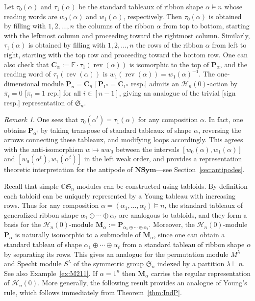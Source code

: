 \documentclass{amsart}
\newtheorem*{Young's Rule}{Young's Rule}
\theoremstyle{definition}
\theoremstyle{remark}
\newtheorem{remark}[theorem]{Remark}
\numberwithin{equation}{section}
\begin{document}
Let $\tau_0(\alpha)$ and $\tau_1(\alpha)$ be the standard tableaux of ribbon shape $\alpha\models n$ whose reading words are $w_0(\alpha)$ and $w_1(\alpha)$, respectively. Then $\tau_0(\alpha)$ is obtained by filling with $1,2,\ldots,n$ the columns of the ribbon $\alpha$ from top to bottom, starting with the leftmost column and proceeding toward the rightmost column. Similarly, $\tau_1(\alpha)$ is obtained by filling with $1,2,\ldots,n$ the rows of the ribbon $\alpha$ from left to right, starting with the top row and proceeding toward the bottom row. One can also check that ${\mathbf{C}}_\alpha :={{\mathbb F}} \cdot \tau_1({\operatorname{rev}}(\alpha))$ is isomorphic to the top of ${\mathbf{P}}_\alpha$, and the reading word of $\tau_1({\operatorname{rev}}(\alpha))$ is $w_1({\operatorname{rev}}(\alpha))=w_1(\alpha)^{-1}$. The one-dimensional module ${\mathbf{P}}_n={\mathbf{C}}_n$ [\,${\mathbf{P}}_{1^n}={\mathbf{C}}_{1^n}$ resp.] admits an ${\mathcal{H}}_n(0)$-action by ${\overline{\pi}}_i=0$ [${\overline{\pi}}_i=1$ rep.] for all $i\in[n-1]$, giving an analogue of the trivial [sign resp.] representation of ${{\mathfrak S}}_n$. 

\begin{remark}\label{rem:symmetryA}
One sees that $\tau_0(\alpha^t)=\tau_1(\alpha)$ for any composition $\alpha$. In fact, one obtains ${\mathbf{P}}_{\alpha^t}$ by taking transpose of standard tableaux of shape $\alpha$, reversing the arrows connecting these tableaux, and modifying loops accordingly. This agrees with the anti-isomorphism $w\mapsto ww_0$ between the intervals $[w_0(\alpha),w_1(\alpha)]$ and $[w_0(\alpha^t),w_1(\alpha^t)]$ in the left weak order, and provides a representation theoretic interpretation for the antipode of ${\mathbf{NSym}}$---see Section~\ref{sec:antipodes}. 
\end{remark}

Recall that simple ${{\mathbb C}}{{\mathfrak S}}_n$-modules can be constructed using tabloids. By definition each tabloid can be uniquely represented by a Young tableau with increasing rows. Thus for any composition $\alpha=(\alpha_1,\ldots,\alpha_\ell)\models n$, the standard tableaux of generalized ribbon shape $\alpha_1\oplus\cdots\oplus\alpha_\ell$ are analogous to tabloids, and they form a basis for the ${\mathcal{H}}_n(0)$-module ${\mathbf{M}}_\alpha:={\mathbf{P}}_{\alpha_1\oplus\cdots\oplus\alpha_\ell}$. Moreover, the ${\mathcal{H}}_n(0)$-module ${\mathbf{P}}_\alpha$ is naturally isomorphic to a submodule of ${\mathbf{M}}_\alpha$, since one can obtain a standard tableau of shape $\alpha_1\oplus\cdots\oplus\alpha_\ell$ from a standard tableau of ribbon shape $\alpha$ by separating its rows. This gives an analogue for the permutation module $M^\lambda$ and Specht module $S^\lambda$ of the symmetric group ${{\mathfrak S}}_n$ indexed by a partition $\lambda\vdash n$. See also Example~\ref{ex:M211}. If $\alpha=1^n$ then ${\mathbf{M}}_\alpha$ carries the regular representation of ${\mathcal{H}}_n(0)$. More generally, the following result provides an analogue of Young's rule, which follows immediately from Theorem~\ref{thm:IndP}.
\end{document}
